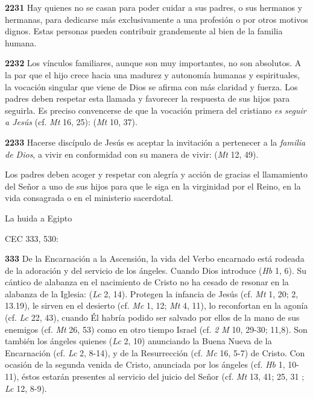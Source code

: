 \begin{body}
\begin{body}
\textbf{2231} Hay quienes no se casan para poder cuidar a sus padres, o sus hermanos y hermanas, para dedicarse más exclusivamente a una profesión o por otros motivos dignos. Estas personas pueden contribuir grandemente al bien de la familia humana.

\textbf{2232} Los vínculos familiares, aunque son muy importantes, no son absolutos. A la par que el hijo crece hacia una madurez y autonomía humanas y espirituales, la vocación singular que viene de Dios se afirma con más claridad y fuerza. Los padres deben respetar esta llamada y favorecer la respuesta de sus hijos para seguirla. Es preciso convencerse de que la vocación primera del cristiano \emph{es seguir a Jesús} (cf. \emph{Mt} 16, 25):  (\emph{Mt} 10, 37).

\textbf{2233} Hacerse discípulo de Jesús es aceptar la invitación a pertenecer a la \emph{familia de Dios}, a vivir en conformidad con su manera de vivir:  (\emph{Mt} 12, 49).

Los padres deben acoger y respetar con alegría y acción de gracias el llamamiento del Señor a uno de sus hijos para que le siga en la virginidad por el Reino, en la vida consagrada o en el ministerio sacerdotal.

La huida a Egipto

CEC 333, 530:

\textbf{333} De la Encarnación a la Ascensión, la vida del Verbo encarnado está rodeada de la adoración y del servicio de los ángeles. Cuando Dios introduce  (\emph{Hb} 1, 6). Su cántico de alabanza en el nacimiento de Cristo no ha cesado de resonar en la alabanza de la Iglesia:  (\emph{Lc} 2, 14). Protegen la infancia de Jesús (cf. \emph{Mt} 1, 20; 2, 13.19), le sirven en el desierto (cf. \emph{Mc} 1, 12; \emph{Mt} 4, 11), lo reconfortan en la agonía (cf. \emph{Lc} 22, 43), cuando Él habría podido ser salvado por ellos de la mano de sus enemigos (cf. \emph{Mt} 26, 53) como en otro tiempo Israel (cf. \emph{2 M} 10, 29-30; 11,8). Son también los ángeles quienes  (\emph{Lc} 2, 10) anunciando la Buena Nueva de la Encarnación (cf. \emph{Lc} 2, 8-14), y de la Resurrección (cf. \emph{Mc} 16, 5-7) de Cristo. Con ocasión de la segunda venida de Cristo, anunciada por los ángeles (cf. \emph{Hb} 1, 10-11), éstos estarán presentes al servicio del juicio del Señor (cf. \emph{Mt} 13, 41; 25, 31 ; \emph{Lc} 12, 8-9).


\end{body}
\end{body}
